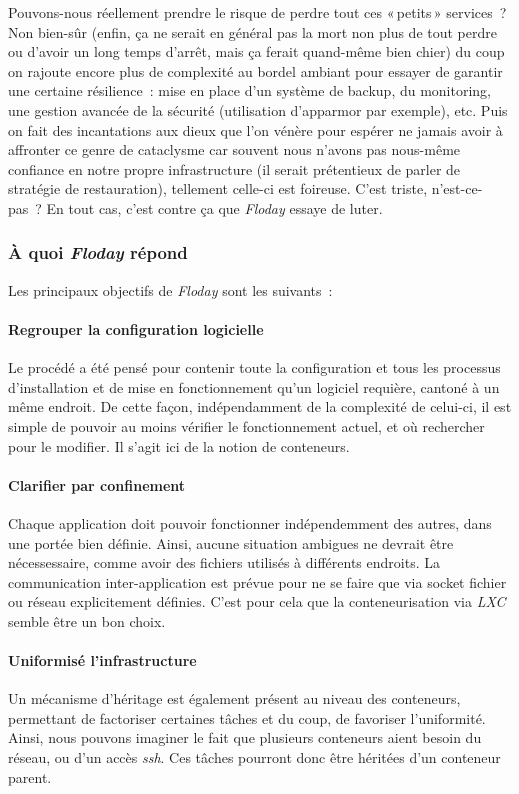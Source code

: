 Pouvons-nous réellement prendre le risque de perdre tout ces «\,petits\,» services~?
Non bien-sûr (enfin, ça ne serait en général pas la mort non plus de tout perdre ou d'avoir un long temps d'arrêt, mais ça ferait quand-même bien chier)
du coup on rajoute encore plus de complexité au bordel ambiant pour essayer de garantir une certaine résilience~: mise en place d'un système de backup, du monitoring, une gestion avancée de la sécurité (utilisation d'apparmor par exemple), etc.
Puis on fait des incantations aux dieux que l'on vénère pour espérer ne jamais avoir à affronter ce genre de cataclysme car souvent nous n'avons pas nous-même confiance en notre propre infrastructure (il serait prétentieux de parler de stratégie de restauration), tellement celle-ci est foireuse.
C'est triste, n'est-ce-pas~? En tout cas, c'est contre ça que \emph{Floday} essaye de luter.

\subsubsection{À quoi \emph{Floday} répond}
Les principaux objectifs de \emph{Floday} sont les suivants~:

\paragraph{Regrouper la configuration logicielle}
Le procédé a été pensé pour contenir toute la configuration et tous les processus d'installation et de mise en fonctionnement qu'un logiciel requière, cantoné à un même endroit.
De cette façon, indépendamment de la complexité de celui-ci, il est simple de pouvoir au moins vérifier le fonctionnement actuel, et où rechercher pour le modifier.
Il s'agit ici de la notion de \glspl{conteneur}.

\paragraph{Clarifier par confinement}
Chaque \gls{application} doit pouvoir fonctionner indépendemment des autres, dans une portée bien définie.
Ainsi, aucune situation ambigues ne devrait être nécessessaire, comme avoir des fichiers utilisés à différents endroits.
La communication inter-application est prévue pour ne se faire que via socket fichier ou réseau explicitement définies.
C'est pour cela que la conteneurisation via \emph{LXC} semble être un bon choix.

\paragraph{Uniformisé l'infrastructure}
Un mécanisme d'héritage est également présent au niveau des \glspl{conteneur}, permettant de factoriser certaines tâches et du coup, de favoriser l'uniformité.
Ainsi, nous pouvons imaginer le fait que plusieurs conteneurs aient besoin du réseau, ou d'un accès \emph{ssh}.
Ces tâches pourront donc être héritées d'un conteneur parent.

